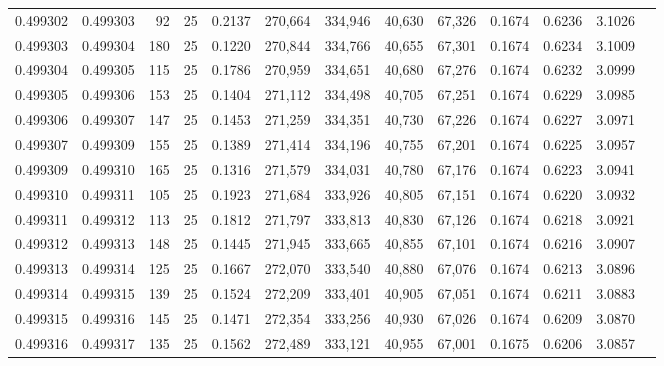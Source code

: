 \begin{tabular}{rrrrrrrrrrrrr}
0.499302 & 0.499303 &  92 &  25 &                                     0.2137 & 270,664 & 334,946 &  40,630 &  67,326 & 0.1674 & 0.6236 & 3.1026 \\
0.499303 & 0.499304 & 180 &  25 &                                     0.1220 & 270,844 & 334,766 &  40,655 &  67,301 & 0.1674 & 0.6234 & 3.1009 \\
0.499304 & 0.499305 & 115 &  25 &                                     0.1786 & 270,959 & 334,651 &  40,680 &  67,276 & 0.1674 & 0.6232 & 3.0999 \\
0.499305 & 0.499306 & 153 &  25 &                                     0.1404 & 271,112 & 334,498 &  40,705 &  67,251 & 0.1674 & 0.6229 & 3.0985 \\
0.499306 & 0.499307 & 147 &  25 &                                     0.1453 & 271,259 & 334,351 &  40,730 &  67,226 & 0.1674 & 0.6227 & 3.0971 \\
0.499307 & 0.499309 & 155 &  25 &                                     0.1389 & 271,414 & 334,196 &  40,755 &  67,201 & 0.1674 & 0.6225 & 3.0957 \\
0.499309 & 0.499310 & 165 &  25 &                                     0.1316 & 271,579 & 334,031 &  40,780 &  67,176 & 0.1674 & 0.6223 & 3.0941 \\
0.499310 & 0.499311 & 105 &  25 &                                     0.1923 & 271,684 & 333,926 &  40,805 &  67,151 & 0.1674 & 0.6220 & 3.0932 \\
0.499311 & 0.499312 & 113 &  25 &                                     0.1812 & 271,797 & 333,813 &  40,830 &  67,126 & 0.1674 & 0.6218 & 3.0921 \\
0.499312 & 0.499313 & 148 &  25 &                                     0.1445 & 271,945 & 333,665 &  40,855 &  67,101 & 0.1674 & 0.6216 & 3.0907 \\
0.499313 & 0.499314 & 125 &  25 &                                     0.1667 & 272,070 & 333,540 &  40,880 &  67,076 & 0.1674 & 0.6213 & 3.0896 \\
0.499314 & 0.499315 & 139 &  25 &                                     0.1524 & 272,209 & 333,401 &  40,905 &  67,051 & 0.1674 & 0.6211 & 3.0883 \\
0.499315 & 0.499316 & 145 &  25 &                                     0.1471 & 272,354 & 333,256 &  40,930 &  67,026 & 0.1674 & 0.6209 & 3.0870 \\
0.499316 & 0.499317 & 135 &  25 &                                     0.1562 & 272,489 & 333,121 &  40,955 &  67,001 & 0.1675 & 0.6206 & 3.0857 \\

\end{tabular}
